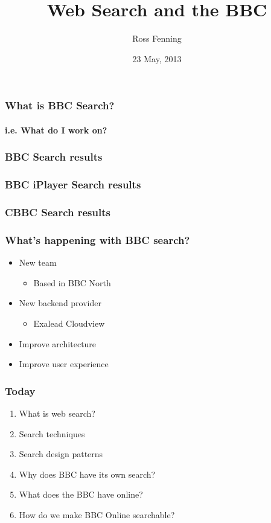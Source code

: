 \documentclass{beamer}
\title{Web Search and the BBC}
\author{Ross Fenning}
\institute{Senior Software Engineer\\Search and Navigation\\Future Media\\BBC}
\date{23 May, 2013}
\begin{document}
\begin{frame}[plain]
  \titlepage
\end{frame}

\begin{frame}
  \frametitle{What is BBC Search?}
  \framesubtitle{i.e. What do I work on?}
\end{frame}

\begin{frame}
  \frametitle{BBC Search results}
\end{frame}

\begin{frame}
  \frametitle{BBC iPlayer Search results}
\end{frame}

\begin{frame}
  \frametitle{CBBC Search results}
\end{frame}

\begin{frame}
  \frametitle{What's happening with BBC search?}
  \begin{itemize}
    \pause \item New team
    \begin{itemize}
    \pause \item Based in BBC North
    \end{itemize}
    \pause \item New backend provider
    \begin{itemize}
    \pause \item Exalead Cloudview
    \end{itemize}
    \pause \item Improve architecture
    \pause \item Improve user experience
  \end{itemize}
\end{frame}

\begin{frame}
  \frametitle{Today}
  \begin{enumerate}
    \pause \item What is web search?
    \pause \item Search techniques
    \pause \item Search design patterns
    \pause \item Why does BBC have its own search?
    \pause \item What does the BBC have online?
    \pause \item How do we make BBC Online searchable?
  \end{enumerate}
\end{frame}
\end{document}
